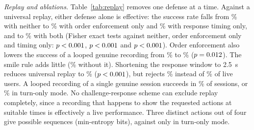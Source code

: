 \documentclass[journal]{IEEEtran}
\begin{document}
\emph{Replay and ablations.} Table~\ref{tab:replay} removes one defense at a time. Against a universal replay, either defense alone is effective: the success rate falls from \attUniversalNoOrderNoTiming\% with neither to \attUniversalNoTiming\% with order enforcement only and \attUniversalNoOrderEnforcement\% with response timing only, and to \attUniversalFull\% with both (Fisher exact tests against neither, order enforcement only and timing only: $p<0.001$, $p<0.001$ and $p<0.001$). Order enforcement also lowers the success of a looped genuine recording from \attReplayNoOrderEnforcement\% to \attReplayFull\% ($p=0.012$). The smile rule adds little (\attUniversalNoSmileRule\% without it). Shortening the response window to 2.5~s reduces universal replay to \attUniversalWindowShort\% ($p<0.001$), but rejects \livFrrWinShort\% instead of \livFrr\% of live users. A looped recording of a single genuine session succeeds in \attReplayFull\% of sessions, or \attReplayTurnsOnly\% in turn-only mode. No challenge-response scheme can exclude replay completely, since a recording that happens to show the requested actions at suitable times is effectively a live performance. Three distinct actions out of four give \seqDistinct{} possible sequences (min-entropy \seqMinEnt{} bits), against only \seqDistinctTurns{} in turn-only mode.
\end{document}
